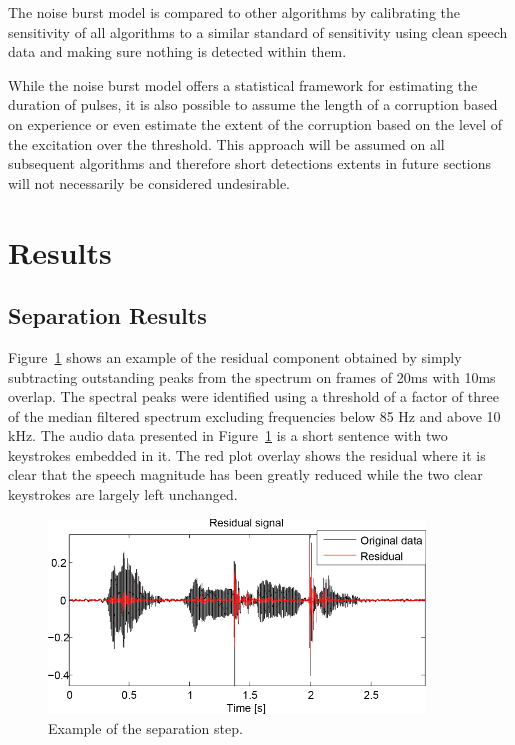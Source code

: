 The noise burst model is compared to other algorithms by calibrating the sensitivity of all algorithms to a similar standard of sensitivity using clean speech data and making sure nothing is detected within them.

While the noise burst model offers a statistical framework for estimating the duration of pulses, it is also possible to assume the length of a corruption based on experience or even estimate the extent of the corruption based on the level of the excitation over the threshold. This approach will be assumed on all subsequent algorithms and therefore short detections extents in future sections will not necessarily be considered undesirable.

\section{Results}\label{sec:WPresults}
\subsection{Separation Results} %
Figure~\ref{fig:Separation_Residual_Example} shows an example of the residual component obtained by simply subtracting outstanding peaks from the spectrum on frames of 20ms with 10ms overlap. The spectral peaks were identified using a threshold of a factor of three of the median filtered spectrum excluding frequencies below 85 Hz and above 10 kHz. The audio data presented in Figure~\ref{fig:Separation_Residual_Example} is a short sentence with two keystrokes embedded in it. The red plot overlay shows the residual where it is clear that the speech magnitude has been greatly reduced while the two clear keystrokes are largely left unchanged. 

\begin{figure}
\begin{minipage}[b]{1.0\linewidth}
  \centering
  \centerline{\includegraphics[width=10cm]{Separation_Residual_Example}}
\end{minipage}
\caption{Example of the separation step.}
\label{fig:Separation_Residual_Example}
\end{figure}

